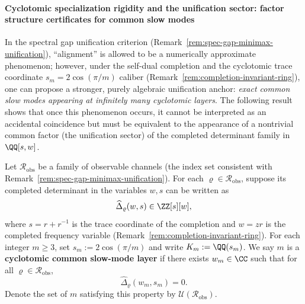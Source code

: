 \paragraph{Cyclotomic specialization rigidity and the unification sector: factor structure certificates for common slow modes}
In the spectral gap unification criterion (Remark~\ref{rem:spec-gap-minimax-unification}), ``alignment'' is allowed to be a numerically approximate phenomenon; however, under the self-dual completion and the cyclotomic trace coordinate \(s_m=2\cos(\pi/m)\) caliber (Remark~\ref{rem:completion-invariant-ring}), one can propose a stronger, purely algebraic unification anchor: \emph{exact common slow modes appearing at infinitely many cyclotomic layers}.
The following result shows that once this phenomenon occurs, it cannot be interpreted as an accidental coincidence but must be equivalent to the appearance of a nontrivial common factor (the unification sector) of the completed determinant family in \(\QQ[s,w]\).

\begin{definition}\label{def:cyclotomic-common-slowmode-layer}
Let \(\mathcal{R}_{\mathrm{obs}}\) be a family of observable channels (the index set consistent with Remark~\ref{rem:spec-gap-minimax-unification}).
For each \(\varrho\in\mathcal{R}_{\mathrm{obs}}\), suppose its completed determinant in the variables \(w,s\) can be written as
\[
\widehat{\Delta}_{\varrho}(w,s)\in\ZZ[s][w],
\]
where \(s=r+r^{-1}\) is the trace coordinate of the completion and \(w=zr\) is the completed frequency variable (Remark~\ref{rem:completion-invariant-ring}).
For each integer \(m\ge 3\), set \(s_m:=2\cos(\pi/m)\) and write \(K_m:=\QQ(s_m)\).
We say \(m\) is a \textbf{cyclotomic common slow-mode layer} if there exists \(w_m\in\CC\) such that for all \(\varrho\in\mathcal{R}_{\mathrm{obs}}\),
\[
\widehat{\Delta}_{\varrho}(w_m,s_m)=0.
\]
Denote the set of \(m\) satisfying this property by \(\mathcal{U}(\mathcal{R}_{\mathrm{obs}})\).
\end{definition}

